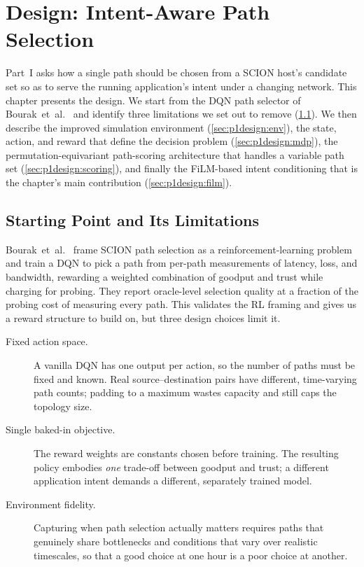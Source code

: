 \chapter{Design: Intent-Aware Path Selection}
\label{ch:p1design}

Part~I asks how a single path should be chosen from a SCION host's candidate set so as to serve the
running application's intent under a changing network. This chapter presents the design. We start from
the DQN path selector of Bourak~et~al.~\cite{Bourak2025} and identify three limitations we set out to
remove (\cref{sec:p1design:strawman}). We then describe the improved simulation environment
(\cref{sec:p1design:env}), the state, action, and reward that define the decision problem
(\cref{sec:p1design:mdp}), the permutation-equivariant path-scoring architecture that handles a
variable path set (\cref{sec:p1design:scoring}), and finally the FiLM-based intent conditioning that is
the chapter's main contribution (\cref{sec:p1design:film}).

\section{Starting Point and Its Limitations}
\label{sec:p1design:strawman}

Bourak~et~al.~\cite{Bourak2025} frame SCION path selection as a reinforcement-learning problem and
train a DQN to pick a path from per-path measurements of latency, loss, and bandwidth, rewarding a
weighted combination of goodput and trust while charging for probing. They report oracle-level
selection quality at a fraction of the probing cost of measuring every path. This validates the RL
framing and gives us a reward structure to build on, but three design choices limit it.

\begin{description}
  \item[Fixed action space.] A vanilla DQN has one output per action, so the number of paths must be
  fixed and known. Real source--destination pairs have different, time-varying path counts; padding to
  a maximum wastes capacity and still caps the topology size.
  \item[Single baked-in objective.] The reward weights are constants chosen before training. The
  resulting policy embodies \emph{one} trade-off between goodput and trust; a different application
  intent demands a different, separately trained model.
  \item[Environment fidelity.] Capturing when path selection actually matters requires paths that
  genuinely share bottlenecks and conditions that vary over realistic timescales, so that a good choice
  at one hour is a poor choice at another.
\end{description}

